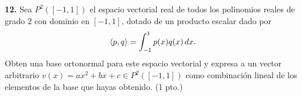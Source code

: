 \documentclass[a4paper]{article}
\begin{document}
\vspace{1cm}
\textbf{12.} Sea $P^2([-1,1])$ el espacio vectorial real de todos los polinomios reales de grado $2$ con dominio en $[-1,1]$, dotado de un producto escalar dado por $$\langle p,q\rangle = \int_{-1}^1 p(x)q(x)\hspace{0.5mm} dx.$$ \noindent Obten una base ortonormal para este espacio vectorial y expresa a un vector arbitrario $v(x)=ax^2+bx+c\in P^2([-1,1])$ como combinación lineal de los elementos de la base que hayas obtenido. (1 pto.)
\end{document}
